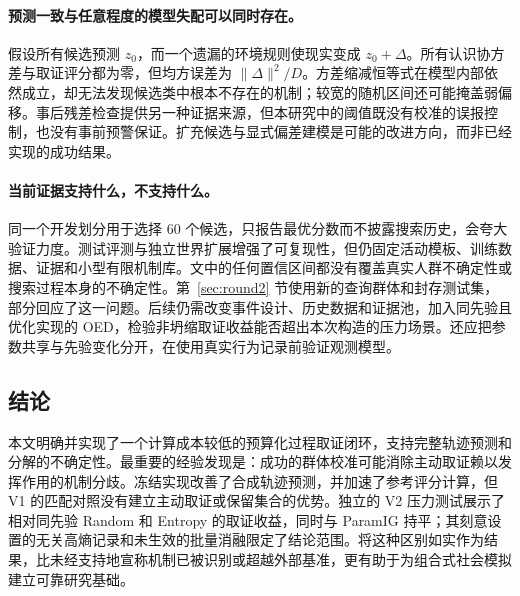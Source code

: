 \paragraph{预测一致与任意程度的模型失配可以同时存在。}
假设所有候选预测 $z_0$，而一个遗漏的环境规则使现实变成 $z_0+\Delta$。所有认识协方差与取证评分都为零，但均方误差为 $\|\Delta\|^2/D$。方差缩减恒等式在模型内部依然成立，却无法发现候选类中根本不存在的机制；较宽的随机区间还可能掩盖弱偏移。事后残差检查提供另一种证据来源，但本研究中的阈值既没有校准的误报控制，也没有事前预警保证。扩充候选与显式偏差建模是可能的改进方向，而非已经实现的成功结果。

\paragraph{当前证据支持什么，不支持什么。}
同一个开发划分用于选择 60 个候选，只报告最优分数而不披露搜索历史，会夸大验证力度。测试评测与独立世界扩展增强了可复现性，但仍固定活动模板、训练数据、证据和小型有限机制库。文中的任何置信区间都没有覆盖真实人群不确定性或搜索过程本身的不确定性。第~\ref{sec:round2} 节使用新的查询群体和封存测试集，部分回应了这一问题。后续仍需改变事件设计、历史数据和证据池，加入同先验且优化实现的 OED，检验非坍缩取证收益能否超出本次构造的压力场景。还应把参数共享与先验变化分开，在使用真实行为记录前验证观测模型。

\subsection{结论}
本文明确并实现了一个计算成本较低的预算化过程取证闭环，支持完整轨迹预测和分解的不确定性。最重要的经验发现是：成功的群体校准可能消除主动取证赖以发挥作用的机制分歧。冻结实现改善了合成轨迹预测，并加速了参考评分计算，但 V1 的匹配对照没有建立主动取证或保留集合的优势。独立的 V2 压力测试展示了相对同先验 Random 和 Entropy 的取证收益，同时与 ParamIG 持平；其刻意设置的无关高熵记录和未生效的批量消融限定了结论范围。将这种区别如实作为结果，比未经支持地宣称机制已被识别或超越外部基准，更有助于为组合式社会模拟建立可靠研究基础。
